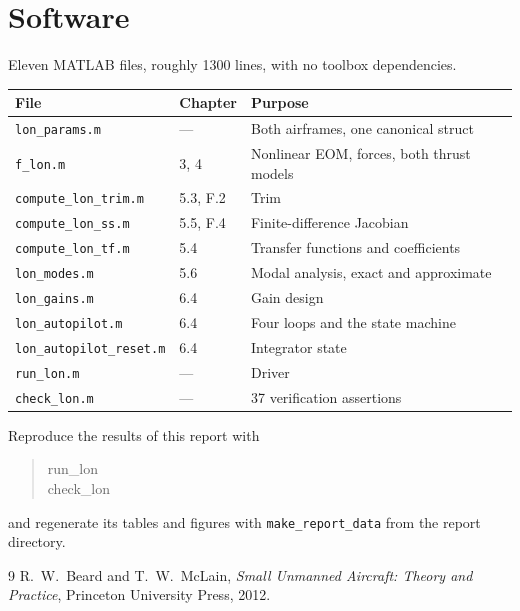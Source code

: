 \documentclass[11pt,a4paper]{article}
\begin{document}
\appendix
\section{Software}

Eleven MATLAB files, roughly 1300 lines, with no toolbox dependencies.

\begin{center}
\begin{tabular}{lll}
\toprule
File & Chapter & Purpose \\
\midrule
\texttt{lon\_params.m} & --- & Both airframes, one canonical struct \\
\texttt{f\_lon.m} & 3, 4 & Nonlinear EOM, forces, both thrust models \\
\texttt{compute\_lon\_trim.m} & 5.3, F.2 & Trim \\
\texttt{compute\_lon\_ss.m} & 5.5, F.4 & Finite-difference Jacobian \\
\texttt{compute\_lon\_tf.m} & 5.4 & Transfer functions and coefficients \\
\texttt{lon\_modes.m} & 5.6 & Modal analysis, exact and approximate \\
\texttt{lon\_gains.m} & 6.4 & Gain design \\
\texttt{lon\_autopilot.m} & 6.4 & Four loops and the state machine \\
\texttt{lon\_autopilot\_reset.m} & 6.4 & Integrator state \\
\texttt{run\_lon.m} & --- & Driver \\
\texttt{check\_lon.m} & --- & 37 verification assertions \\
\bottomrule
\end{tabular}
\end{center}

Reproduce the results of this report with
\begin{quote}\ttfamily
run\_lon \\
check\_lon
\end{quote}
and regenerate its tables and figures with \texttt{make\_report\_data} from the
report directory.

\begin{thebibliography}{9}
R.~W.~Beard and T.~W.~McLain,
\emph{Small Unmanned Aircraft: Theory and Practice},
Princeton University Press, 2012.
\end{thebibliography}
\end{document}

